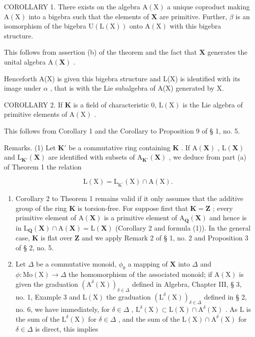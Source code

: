 COROLLARY 1. There exists on the algebra \(\mathrm{A}(\mathrm{X})\) a unique coproduct making \(\mathrm{A}(\mathrm{X})\) into a bigebra such that the elements of \(\mathbf{X}\) are primitive. Further, \(\beta\) is an isomorphism of the bigebra \(\mathrm{U}(\mathrm{L}(\mathrm{X}))\) onto \(\mathrm{A}(\mathrm{X})\) with this bigebra structure.

This follows from assertion (b) of the theorem and the fact that \(\mathbf{X}\) generates the unital algebra \(\mathrm{A}(\mathbf{X})\) .

Henceforth A(X) is given this bigebra structure and L(X) is identified with its image under \(\alpha\) , that is with the Lie subalgebra of A(X) generated by X.

COROLLARY 2. If \(\mathbf{K}\) is a field of characteristic 0, \(\mathrm{L}(\mathrm{X})\) is the Lie algebra of primitive elements of \(\mathrm{A}(\mathrm{X})\) .

This follows from Corollary 1 and the Corollary to Proposition 9 of § 1, no. 5.

Remarks. (1) Let \(\mathbf{K}'\) be a commutative ring containing \(\mathbf{K}\) . If \(\mathrm{A}(\mathbf{X})\) , \(\mathrm{L}(\mathbf{X})\) and \(\mathrm{L}_{\mathbf{K}'}(\mathbf{X})\) are identified with subsets of \(\mathrm{A}_{\mathbf{K}'}(\mathbf{X})\) , we deduce from part (a) of Theorem 1 the relation

\[
\mathrm{L} (\mathrm{X}) = \mathrm{L} _ {\mathrm{K} ^ {\prime}} (\mathrm{X}) \cap \mathrm{A} (\mathrm{X}).\tag{1}
\]

\begin{enumerate}
\def\labelenumi{(\arabic{enumi})}
\setcounter{enumi}{1}
\item
  Corollary 2 to Theorem 1 remains valid if it only assumes that the additive group of the ring \(\mathbf{K}\) is torsion-free. For suppose first that \(\mathbf{K} = \mathbf{Z}\) ; every primitive element of \(\mathrm{A}(\mathbf{X})\) is a primitive element of \(\mathrm{A}_{\mathbf{Q}}(\mathbf{X})\) and hence is in \(\mathrm{L}_{\mathbf{Q}}(\mathbf{X}) \cap \mathrm{A}(\mathbf{X}) = \mathrm{L}(\mathbf{X})\) (Corollary 2 and formula (1)). In the general case, \(\mathbf{K}\) is flat over \(\mathbf{Z}\) and we apply Remark 2 of § 1, no. 2 and Proposition 3 of § 2, no. 5.
\item
  Let \(\Delta\) be a commutative monoid, \(\phi_0\) a mapping of \(\mathbf{X}\) into \(\Delta\) and \(\phi \colon \mathrm{Mo}(\mathrm{X})\to \Delta\) the homomorphism of the associated monoid; if \(\mathrm{A}(\mathrm{X})\) is given the graduation \((\mathrm{A}^{\delta}(\mathrm{X}))_{\delta \in \Delta}\) defined in Algebra, Chapter III, § 3, no. 1, Example 3 and \(\mathrm{L}(\mathrm{X})\) the graduation \((\mathrm{L}^{\delta}(\mathrm{X}))_{\delta \in \Delta}\) defined in § 2, no. 6, we have immediately, for \(\delta \in \Delta\) , \(\mathrm{L}^{\delta}(\mathrm{X})\subset \mathrm{L}(\mathrm{X})\cap \mathrm{A}^{\delta}(\mathrm{X})\) . As \(\mathrm{L}\) is the sum of the \(\mathrm{L}^{\delta}(\mathrm{X})\) for \(\delta \in \Delta\) , and the sum of the \(\mathrm{L}(\mathrm{X})\cap \mathrm{A}^{\delta}(\mathrm{X})\) for \(\delta \in \Delta\) is direct, this implies
\end{enumerate}

